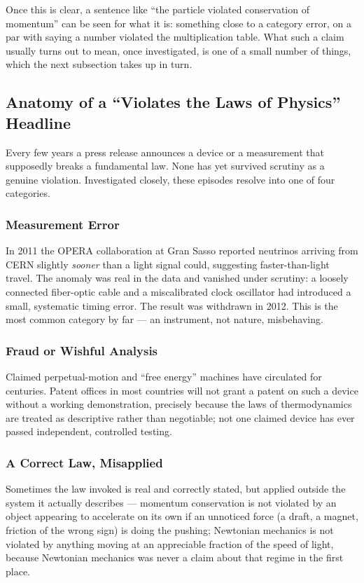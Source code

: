 Once this is clear, a sentence like ``the particle violated conservation of
momentum'' can be seen for what it is: something close to a category
error, on a par with saying a number violated the multiplication table.
What such a claim usually turns out to mean, once investigated, is one of
a small number of things, which the next subsection takes up in turn.

\subsection{Anatomy of a ``Violates the Laws of Physics'' Headline}

Every few years a press release announces a device or a measurement that
supposedly breaks a fundamental law. None has yet survived scrutiny as a
genuine violation. Investigated closely, these episodes resolve into one of
four categories.

\subsubsection{Measurement Error}

In 2011 the OPERA collaboration at Gran Sasso reported neutrinos arriving
from CERN slightly \emph{sooner} than a light signal could, suggesting
faster-than-light travel. The anomaly was real in the data and vanished
under scrutiny: a loosely connected fiber-optic cable and a miscalibrated
clock oscillator had introduced a small, systematic timing error. The
result was withdrawn in 2012. This is the most common category by far ---
an instrument, not nature, misbehaving.

\subsubsection{Fraud or Wishful Analysis}

Claimed perpetual-motion and ``free energy'' machines have circulated for
centuries. Patent offices in most countries will not grant a patent on such
a device without a working demonstration, precisely because the laws of
thermodynamics are treated as descriptive rather than negotiable; not one
claimed device has ever passed independent, controlled testing.

\subsubsection{A Correct Law, Misapplied}

Sometimes the law invoked is real and correctly stated, but applied outside
the system it actually describes --- momentum conservation is not violated
by an object appearing to accelerate on its own if an unnoticed force (a
draft, a magnet, friction of the wrong sign) is doing the pushing; Newtonian
mechanics is not violated by anything moving at an appreciable fraction of
the speed of light, because Newtonian mechanics was never a claim about
that regime in the first place.

